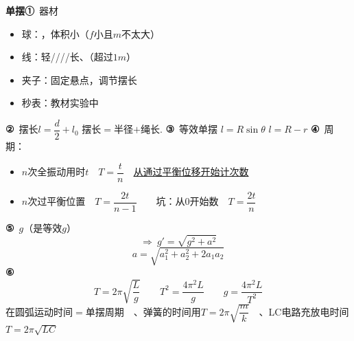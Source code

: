 \textbf{单摆}\quad\textbf{①}\ 器材
\begin{itemize}
\item 球：，体积小\quad（$f$小且$m$不太大）
\item 线：轻////长、（超过$1\unit{m}$）
\item 夹子：固定悬点，调节摆长
\item 秒表：教材实验中\ 
\end{itemize}
\textbf{②}\ 摆长\quad $l=\dfrac{d}{2}+l_0$
摆长$=$半径$+$绳长.
\textbf{③}\ 等效单摆
$l=R\sin\theta$
$l=R-r$
\textbf{④}\ 周期：
\begin{itemize}
\item $n$次全振动用时$t$　$T=\dfrac{t}{n}$　\underline{从通过平衡位移开始计次数} %
\item $n$次过平衡位置　$T=\dfrac{2t}{n-1}$　　坑：从$0$开始数　$T=\dfrac{2t}{n}$
\end{itemize}
\textbf{⑤}\ $g$（是等效$g$）
\[
\Rightarrow\ g'=\sqrt{g^2+a^2}
\]
\[
a=\sqrt{a_1^2+a_2^2+2a_1a_2}
\] %
\textbf{⑥}
\[
T=2\pi\sqrt{\dfrac{L}{g}}\qquad T^2=\dfrac{4\pi^2L}{g}\qquad \boxed{g=\dfrac{4\pi^2L}{T^2}}
\]
在圆弧运动时间$=$单摆周期　、弹簧的时间用$T=2\pi\sqrt{\dfrac{m}{k}}$　、LC电路充放电时间$T=2\pi\sqrt{LC}$
